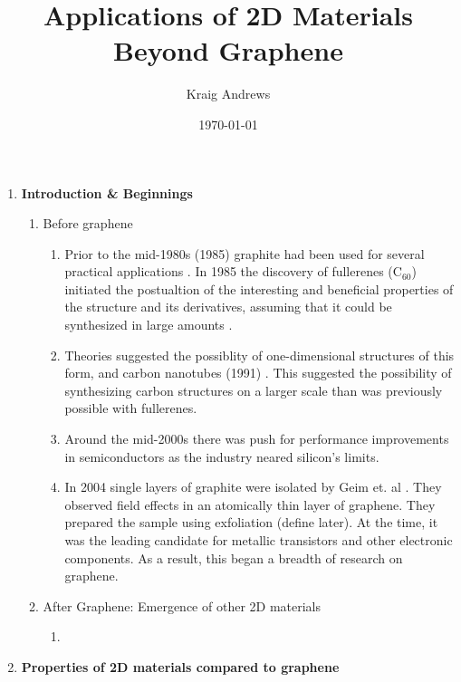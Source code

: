 \documentclass{article}
\author{Kraig Andrews}
\title{Applications of 2D Materials Beyond Graphene}
\date{\today}
\begin{document}
\maketitle

\begin{enumerate}%
	\item{ \textbf{Introduction \& Beginnings}}
	\begin{enumerate} %
		\item{Before graphene}
			\begin{enumerate} %
				\item{Prior to the mid-1980s (1985) graphite had been used for several practical applications \cite{ nanoscaleReview2011}. In 1985 the discovery of fullerenes ($\mathrm{C}_{60}$) initiated the postualtion of the interesting and beneficial properties of the structure and its derivatives, assuming that it could be synthesized in large amounts \cite{krotoFullerenes1985}. }
				\item{Theories suggested the possiblity of one-dimensional structures of this form, and carbon nanotubes (1991) \cite{iijimaCarbonNanotubes1991}. This suggested the possibility of synthesizing carbon structures on a larger scale than was previously possible with fullerenes.}
				\item{Around the mid-2000s there was push for performance improvements in semiconductors as the industry neared silicon's limits.}
				\item{In 2004 single layers of graphite were isolated by Geim et. al \cite{novoselovEtAl2004, novoselovEtAl2005}. They observed field effects in an atomically thin layer of graphene. They prepared the sample using exfoliation (define later). At the time, it was the leading candidate for metallic transistors and other electronic components. As a result, this began a breadth of research on graphene.}
			\end{enumerate}	%
		\item{After Graphene: Emergence of other 2D materials}
			\begin{enumerate} %
				\item{}
			\end{enumerate} %
	\end{enumerate} %
	\item{\textbf{Properties of 2D materials compared to graphene}}
		\begin{enumerate} %

\end{enumerate}
\end{enumerate}
\end{document}
